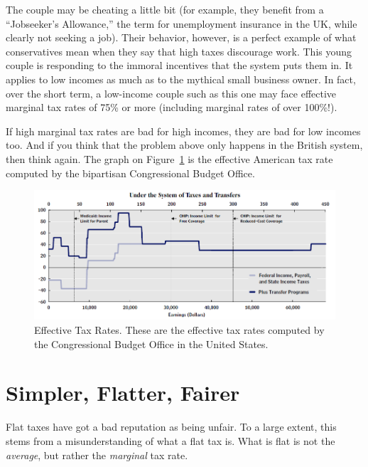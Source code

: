 The couple may be cheating a little bit (for example, they benefit from a
``Jobseeker's Allowance,'' the term for unemployment insurance in the UK, while
clearly not seeking a job). Their behavior, however, is a perfect example of
what conservatives mean when they say that high taxes discourage work. This
young couple is responding to the immoral incentives that the system puts them
in. It applies to low incomes as much as to the mythical small business owner.
In fact, over the short term, a low-income couple such as this one may face
effective marginal tax rates of 75\% or more (including marginal rates of over
100\%!).

If high marginal tax rates are bad for high incomes, they are bad for low
incomes too. And if you think that the problem above only happens in the
British system, then think again. The graph on
Figure~\ref{fig:cbo-effective-tax-rate} is the effective American tax rate
computed by the bipartisan Congressional Budget Office.

\begin{figure}
\begin{center}
\includegraphics[width=.8\textwidth]{images/cbo-effective-tax-rate.png}
\end{center}
\caption{Effective Tax Rates. These are the effective tax rates computed by the
Congressional Budget Office in the United States.}
\label{fig:cbo-effective-tax-rate}
\end{figure}

\section{Simpler, Flatter, Fairer}

Flat taxes have got a bad reputation as being unfair. To a large extent, this
stems from a misunderstanding of what a flat tax is. What is flat is not the
\emph{average}, but rather the \emph{marginal} tax rate.

